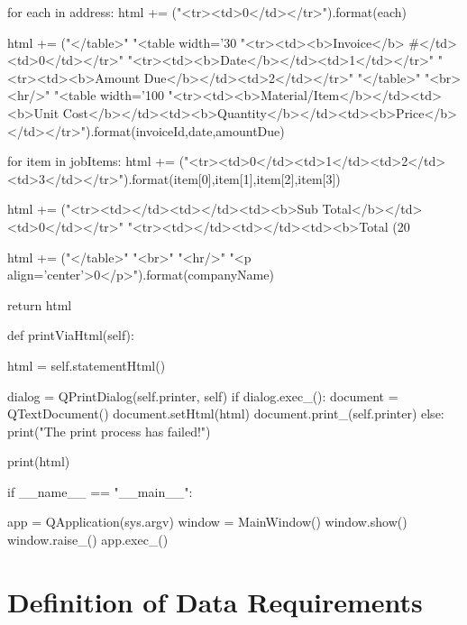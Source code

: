 \begin{python}
        for each in address:
            html += ("<tr><td>{0}</td></tr>").format(each)


        html += ("</table>"
                 "<table width='30%
                 "<tr><td><b>Invoice</b> #</td><td>{0}</td></tr>"
                 "<tr><td><b>Date</b></td><td>{1}</td></tr>"
                 "<tr><td><b>Amount Due</b></td><td>{2}</td></tr>"
                 "</table>"
                 "<br><hr/>"
                 "<table width='100%
                 "<tr><td><b>Material/Item</b></td><td><b>Unit Cost</b></td><td><b>Quantity</b></td><td><b>Price</b></td></tr>").format(invoiceId,date,amountDue)

        for item in jobItems:
            html += ("<tr><td>{0}</td><td>{1}</td><td>{2}</td><td>{3}</td></tr>").format(item[0],item[1],item[2],item[3])

        html += ("<tr><td></td><td></td><td><b>Sub Total</b></td><td>{0}</td></tr>"
                 "<tr><td></td><td></td><td><b>Total (20%

        html += ("</table>"
                 "<br>"
                 "<hr/>"
                 "<p align='center'>{0}</p>").format(companyName)


        return html

        

    def printViaHtml(self):

        html = self.statementHtml()

        dialog = QPrintDialog(self.printer, self)
        if dialog.exec_():
            document = QTextDocument()
            document.setHtml(html)
            document.print_(self.printer)
        else:
            print("The print process has failed!")

        print(html)
        


if __name__ == "__main__":

    app = QApplication(sys.argv)
    window = MainWindow()
    window.show()
    window.raise_()
    app.exec_()


\end{python}

\pagebreak
\section{Definition of Data Requirements}

